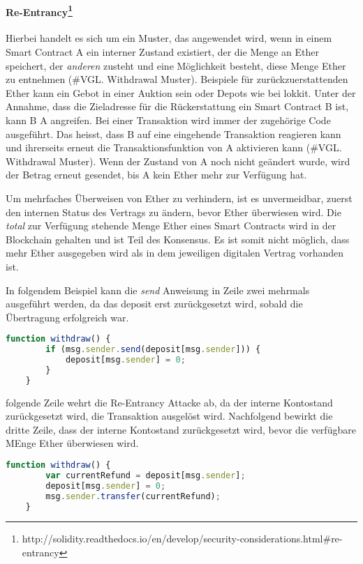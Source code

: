 \paragraph{Re-Entrancy\footnote{http://solidity.readthedocs.io/en/develop/security-considerations.html\#re-entrancy}}
Hierbei handelt es sich um ein Muster, das angewendet wird, wenn in einem Smart Contract A ein interner Zustand existiert, der die Menge an Ether speichert, der \emph{anderen} zusteht und eine Möglichkeit besteht, diese Menge Ether zu entnehmen (\#VGL. Withdrawal Muster). Beispiele für zurückzuerstattenden Ether kann ein Gebot in einer Auktion sein oder Depots wie bei lokkit.
Unter der Annahme, dass die Zieladresse für die Rückerstattung ein Smart Contract B ist, kann B A angreifen. Bei einer Transaktion wird immer der zugehörige Code ausgeführt. Das heisst, dass B auf eine eingehende Transaktion reagieren kann und ihrerseits erneut die Transaktionsfunktion von A aktivieren kann (\#VGL. Withdrawal Muster). Wenn der Zustand von A noch nicht geändert wurde, wird der Betrag erneut gesendet, bis A kein Ether mehr zur Verfügung hat.

Um mehrfaches Überweisen von Ether zu verhindern, ist es unvermeidbar, zuerst den internen Status des Vertrags zu ändern, bevor Ether überwiesen wird. Die \emph{total} zur Verfügung stehende Menge Ether eines Smart Contracts wird in der Blockchain gehalten und ist Teil des Konsensus. Es ist somit nicht möglich, dass mehr Ether ausgegeben wird als in dem jeweiligen digitalen Vertrag vorhanden ist. 

In folgendem Beispiel kann die \emph{send} Anweisung in Zeile zwei mehrmals ausgeführt werden, da das deposit erst zurückgesetzt wird, sobald die Übertragung erfolgreich war.
\begin{lstlisting}[language=javascript,caption=fehlerhaftes Code Snippet]
    function withdraw() {
        if (msg.sender.send(deposit[msg.sender])) {
            deposit[msg.sender] = 0;
        }
    }
\end{lstlisting}

folgende Zeile wehrt die Re-Entrancy Attacke ab, da der interne Kontostand zurückgesetzt wird, die Transaktion ausgelöst wird.
Nachfolgend bewirkt die dritte Zeile, dass der interne Kontostand zurückgesetzt wird, bevor die verfügbare MEnge Ether überwiesen wird.
\begin{lstlisting}[language=javascript,caption=empfohlenes Code Snippet]
    function withdraw() {
        var currentRefund = deposit[msg.sender];
        deposit[msg.sender] = 0;
        msg.sender.transfer(currentRefund);
    }
\end{lstlisting}

